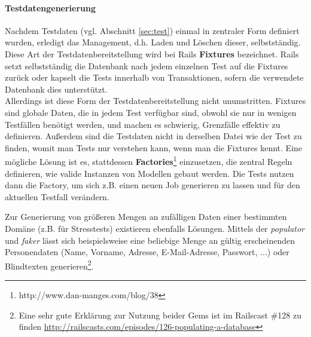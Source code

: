 \paragraph{Testdatengenerierung}
Nachdem Testdaten (vgl. Abschnitt \ref{sec:test}) einmal in zentraler Form definiert wurden, erledigt  das Management, d.h. Laden und Löschen dieser, selbstständig. Diese Art der Testdatenbereitstellung wird bei Rails \textbf{Fixtures} bezeichnet. Rails setzt selbstständig die Datenbank nach jedem einzelnen Test auf die Fixtures zurück oder kapselt die Tests innerhalb von Transaktionen, sofern die verwendete Datenbank dies unterstützt.\\
Allerdings ist diese Form der Testdatenbereitstellung nicht unumstritten. Fixtures sind globale Daten, die in jedem Test verfügbar sind, obwohl sie nur in wenigen Testfällen benötigt werden, und machen es schwierig, Grenzfälle effektiv zu definieren. Außerdem sind die Testdaten nicht in derselben Datei wie der Test zu finden, womit man Tests nur verstehen kann, wenn man die Fixtures kennt. Eine mögliche Lösung ist es, stattdessen \textbf{Factories}\footnote{http://www.dan-manges.com/blog/38} einzusetzen, die zentral Regeln definieren, wie valide Instanzen von Modellen gebaut werden. Die Tests nutzen dann die Factory, um sich z.B. einen neuen Job generieren zu lassen und für den aktuellen Testfall verändern.

Zur Generierung von größeren Mengen an zufälligen Daten einer bestimmten Domäne (z.B. für Stresstests) existieren ebenfalls Lösungen. Mittels der  \textit{populator} und \textit{faker} lässt sich beispielsweise eine beliebige Menge an gültig erscheinenden Personendaten (Name, Vorname, Adresse, E-Mail-Adresse, Passwort, ...) oder Blindtexten generieren\footnote{Eine sehr gute Erklärung zur Nutzung beider Gems ist im Railscast \#128 zu finden \url{http://railscasts.com/episodes/126-populating-a-database}}.



